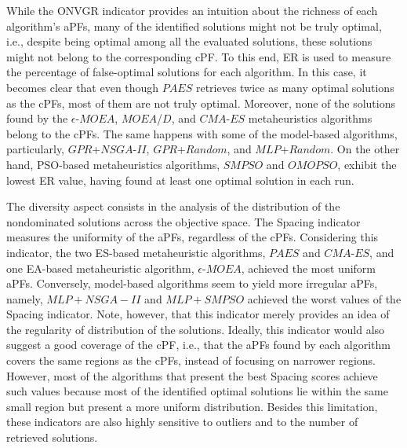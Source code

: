 While the \ac{ONVGR} indicator provides an intuition about the richness of each algorithm's \acp{aPF}, many of the identified solutions might not be truly optimal, i.e., despite being optimal among all the evaluated solutions, these solutions might not belong to the corresponding \ac{cPF}. To this end, \ac{ER} is used to measure the percentage of false-optimal solutions for each algorithm. In this case, it becomes clear that even though $PAES$ retrieves twice as many optimal solutions as the \acp{cPF}, most of them are not truly optimal. Moreover, none of the solutions found by the $\epsilon$-$MOEA$, $MOEA$/$D$, and $CMA$-$ES$ metaheuristics algorithms belong to the \acp{cPF}. The same happens with some of the model-based algorithms, particularly, $GPR$+$NSGA$-$II$, $GPR$+$Random$, and $MLP$+$Random$. On the other hand, \ac{PSO}-based metaheuristics algorithms, $SMPSO$ and $OMOPSO$, exhibit the lowest \ac{ER} value, having found at least one optimal solution in each run.

The diversity aspect consists in the analysis of the distribution of the nondominated solutions across the objective space. The Spacing indicator measures the uniformity of the \acp{aPF}, regardless of the \acp{cPF}. Considering this indicator, the two \ac{ES}-based metaheuristic algorithms, $PAES$ and $CMA$-$ES$, and one \ac{EA}-based metaheuristic algorithm, $\epsilon$-$MOEA$, achieved the most uniform \acp{aPF}. Conversely, model-based algorithms seem to yield more irregular \acp{aPF}, namely, $MLP+NSGA-II$ and $MLP+SMPSO$ achieved the worst values of the Spacing indicator. Note, however, that this indicator merely provides an idea of the regularity of distribution of the solutions. Ideally, this indicator would also suggest a good coverage of the \ac{cPF}, i.e., that the \acp{aPF} found by each algorithm covers the same regions as the \acp{cPF}, instead of focusing on narrower regions. However, most of the algorithms that present the best Spacing scores achieve such values because most of the identified optimal solutions lie within the same small region but present a more uniform distribution. Besides this limitation, these indicators are also highly sensitive to outliers and to the number of retrieved solutions. %

